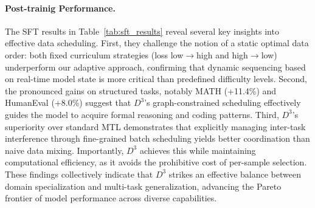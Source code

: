 \begin{table}[htbp]
\centering
\caption{Performance comparison of various data scheduling strategies during SFT on Llama-3-8B. Subscripts denote the relative improvement compared to the strongest baseline across all categories. Best results are highlighted in bold.}
\label{tab:sft_results}
\end{table}
\paragraph{Post-trainig Performance.} 
The SFT results in Table~\ref{tab:sft_results} reveal several key insights into effective data scheduling.
First, they challenge the notion of a static optimal data order: both fixed curriculum strategies (loss low$\to$high and high$\to$low) underperform our adaptive approach, confirming that dynamic sequencing based on real-time model state is more critical than predefined difficulty levels.
Second, the pronounced gains on structured tasks, notably MATH (+11.4\%) and HumanEval (+8.0\%) suggest that $D^3$'s graph-constrained scheduling effectively guides the model to acquire formal reasoning and coding patterns.
Third, $D^3$'s superiority over standard MTL demonstrates that explicitly managing inter-task interference through fine-grained batch scheduling yields better coordination than naive data mixing. Importantly, $D^3$ achieves this while maintaining computational efficiency, as it avoids the prohibitive cost of per-sample selection. These findings collectively indicate that $D^3$ strikes an effective balance between domain specialization and multi-task generalization, advancing the Pareto frontier of model performance across diverse capabilities.


